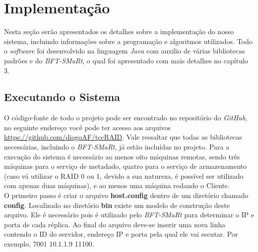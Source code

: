 





\section{Implementação}
Nesta seção serão apresentados os detalhes sobre a implementação do nosso sistema, incluindo informações sobre a programação e algoritmos utilizados. Todo o \textit{software} foi desenvolvido na linguagem \textit{Java} com auxilio de várias bibliotecas padrões e do \textit{BFT-SMaRt}, o qual foi apresentado com mais detalhes no capítulo 3. 
\\

\subsection{Executando o Sistema}
O código-fonte de todo o projeto pode ser encontrado no repositório do \textit{GitHub}, no seguinte endereço você pode ter acesso aos arquivos \href{https://github.com/diogoAF/tccRAID}{https://github.com/diogoAF/tccRAID}. Vale ressaltar que todas as bibliotecas necessárias, incluindo o  \textit{BFT-SMaRt}, já estão incluídas no projeto. Para a execução do sistema é necessário ao menos oito máquinas remotas, sendo três máquinas para o serviço de metadado, quatro para o serviço de armazenamento (caso vá utilizar o RAID 0 ou 1, devido a sua natureza, é possível ser utilizado com apenas duas máquinas), e ao menos uma máquina rodando o Cliente.
\\

O primeiro passo é criar o arquivo \textbf{host.config} dentro de um diretório chamado \textbf{config}. Localizado no diretório \textbf{bin} existe um modelo de construção deste arquivo. Ele é necessário pois é utilizado pelo \textit{BFT-SMaRt} para determinar o IP e porta de cada réplica. Ao final do arquivo deve-se inserir uma nova linha contendo o ID do servidor, endereço IP e porta pela qual ele vai escutar. Por exemplo, 7001 10.1.1.9 11100.
\\

